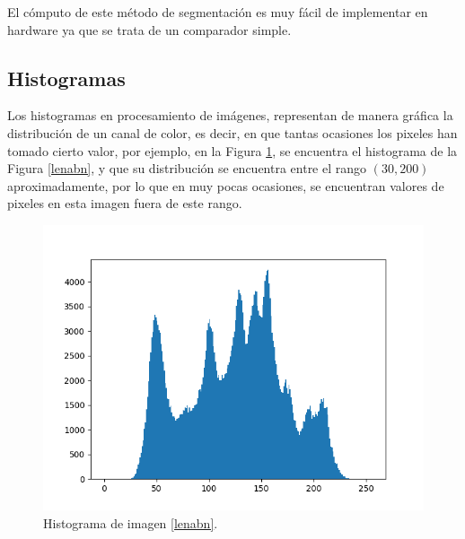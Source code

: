 \documentclass[twoside,spanish,ESP,MSc]{plantillaLabUPV}
\theoremstyle{definition}
\begin{document}
El cómputo de este método de segmentación es muy fácil de implementar en hardware ya que se trata de un comparador simple.


\subsection{Histogramas}
Los histogramas en procesamiento de imágenes, representan de manera gráfica la distribución de un canal de color, es decir, en que tantas ocasiones los pixeles han tomado cierto valor,  por ejemplo, en la Figura \ref{histolena}, se encuentra el histograma de la Figura \ref{lenabn}, y que su distribución se encuentra entre el rango $(30,200)$ aproximadamente, por lo que en muy pocas ocasiones, se encuentran valores de pixeles en esta imagen fuera de este rango.

\begin{figure}[!tbh] 
	\centering 
	\includegraphics[scale=.6]{ima/histolena} 
	\caption{Histograma de imagen \ref{lenabn}.} 
	\label{histolena} 
\end{figure}
\end{document}
